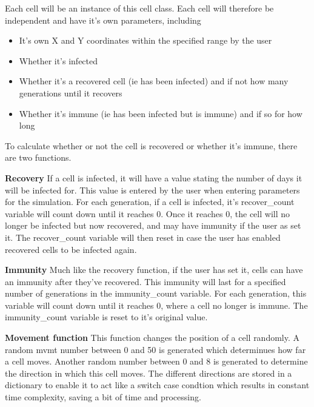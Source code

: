 \documentclass[11pt, a4paper]{article}
\begin{document}
Each cell will be an instance of this cell class. Each cell will therefore be independent and have it's own parameters, including
\begin{itemize}
    \item It's own X and Y coordinates within the specified range by the user
    \item Whether it's infected
    \item Whether it's a recovered cell (ie has been infected) and if not how many generations until it recovers
    \item Whether it's immune (ie has been infected but is immune) and if so for how long
\end{itemize}

To calculate whether or not the cell is recovered or whether it's immune, there are two functions. 

\textbf{Recovery}
If a cell is infected, it will have a value stating the number of days it will be infected for. This value is entered by the user when entering parameters for the simulation. For each generation, if a cell is infected, it's recover\_count variable will count down until it reaches 0. Once it reaches 0, the cell will no longer be infected but now recovered, and may have immunity if the user as set it. The recover\_count variable will then reset in case the user has enabled recovered cells to be infected again.

\textbf{Immunity}
Much like the recovery function, if the user has set it, cells can have an immunity after they've recovered. This immunity will last for a specified number of generations in the immunity\_count variable. For each generation, this variable will count down until it reaches 0, where a cell no longer is immune. The immunity\_count variable is reset to it's original value.


\textbf{Movement function}
This function changes the position of a cell randomly. A random mvmt number between 0 and 50 is generated which determinues how far a cell moves. Another random number between 0 and 8 is generated to determine the direction in which this cell moves. The different directions are stored in a dictionary to enable it to act like a switch case condtion which results in constant time complexity, saving a bit of time and processing.
\end{document}
